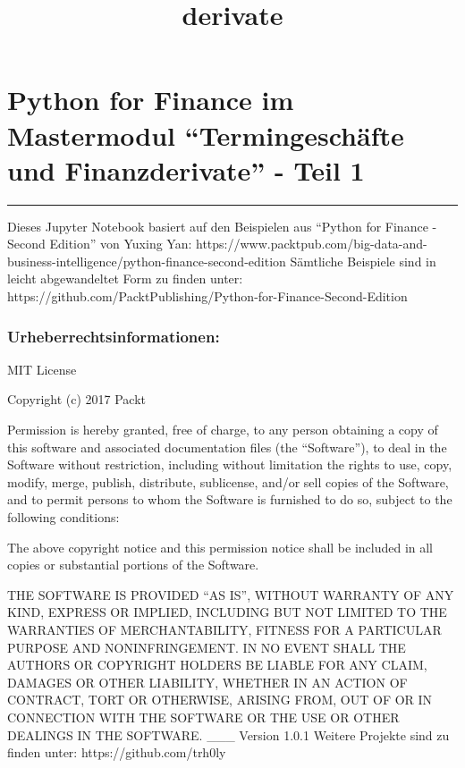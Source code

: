 \documentclass[paper=landscape]{scrartcl}
\title{derivate}
\begin{document}
    
    \maketitle
    
    

    
    \hypertarget{python-for-finance-im-mastermodul-termingeschuxe4fte-und-finanzderivate---teil-1}{%
\section{Python for Finance im Mastermodul ``Termingeschäfte und
Finanzderivate'' - Teil
1}\label{python-for-finance-im-mastermodul-termingeschuxe4fte-und-finanzderivate---teil-1}}

\begin{center}\rule{0.5\linewidth}{\linethickness}\end{center}

Dieses Jupyter Notebook basiert auf den Beispielen aus ``Python for
Finance - Second Edition'' von Yuxing Yan:
https://www.packtpub.com/big-data-and-business-intelligence/python-finance-second-edition
Sämtliche Beispiele sind in leicht abgewandeltet Form zu finden unter:
https://github.com/PacktPublishing/Python-for-Finance-Second-Edition

\hypertarget{urheberrechtsinformationen}{%
\subsubsection{Urheberrechtsinformationen:}\label{urheberrechtsinformationen}}

MIT License

Copyright (c) 2017 Packt

Permission is hereby granted, free of charge, to any person obtaining a
copy of this software and associated documentation files (the
``Software''), to deal in the Software without restriction, including
without limitation the rights to use, copy, modify, merge, publish,
distribute, sublicense, and/or sell copies of the Software, and to
permit persons to whom the Software is furnished to do so, subject to
the following conditions:

The above copyright notice and this permission notice shall be included
in all copies or substantial portions of the Software.

THE SOFTWARE IS PROVIDED ``AS IS'', WITHOUT WARRANTY OF ANY KIND,
EXPRESS OR IMPLIED, INCLUDING BUT NOT LIMITED TO THE WARRANTIES OF
MERCHANTABILITY, FITNESS FOR A PARTICULAR PURPOSE AND NONINFRINGEMENT.
IN NO EVENT SHALL THE AUTHORS OR COPYRIGHT HOLDERS BE LIABLE FOR ANY
CLAIM, DAMAGES OR OTHER LIABILITY, WHETHER IN AN ACTION OF CONTRACT,
TORT OR OTHERWISE, ARISING FROM, OUT OF OR IN CONNECTION WITH THE
SOFTWARE OR THE USE OR OTHER DEALINGS IN THE SOFTWARE. \_\_\_ Version
1.0.1 Weitere Projekte sind zu finden unter: https://github.com/trh0ly
\end{document}
